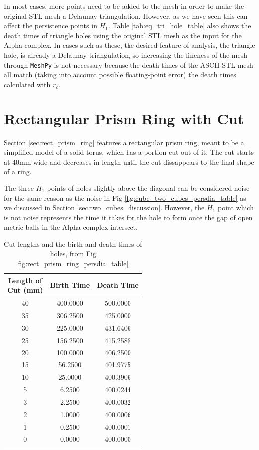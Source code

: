 \documentclass[ma]{uncgdissertationexp}
\theoremstyle{plain}
\theoremstyle{definition}
\theoremstyle{remark}
\begin{document}
\par In most cases, more points need to be added to the mesh in order to make the original STL mesh a Delaunay triangulation. However, as we have seen this can affect the persistence points in $H_{1}$. Table \ref{tab:eq_tri_hole_table} also shows the death times of triangle holes using the original STL mesh as the input for the Alpha complex. In cases such as these, the desired feature of analysis, the triangle hole, is already a Delaunay triangulation, so increasing the fineness of the mesh through \verb"MeshPy" is not necessary because the death times of the ASCII STL mesh all match (taking into account possible floating-point error) the death times calculated with $r_{c}$.

\newpage
\section{Rectangular Prism Ring with Cut}
\par Section \ref{sec:rect_prism_ring} features a rectangular prism ring, meant to be a simplified model of a solid torus, which has a portion cut out of it. The cut starts at 40mm wide and decreases in length until the cut dissappears to the final shape of a ring.
\par The three $H_{1}$ points of holes slightly above the diagonal can be considered noise for the same reason as the noise in Fig \ref{fig:cube_two_cubes_persdia_table} as we discussed in Section \ref{sec:two_cubes_discussion}. However, the $H_{1}$ point which is not noise represents the time it takes for the hole to form once the gap of open metric balls in the Alpha complex intersect.
\begin{table}[H]
\centering
\begin{tabular}{|c|c|c|}
    \hline
    \makecell{Length of\\Cut (mm)} & Birth Time & Death Time \\
    \hline
    40 & 400.0000 & 500.0000 \\
    35 & 306.2500 & 425.0000 \\
    30 & 225.0000 & 431.6406 \\
    25 & 156.2500 & 415.2588 \\
    20 & 100.0000 & 406.2500 \\
    15 & 56.2500 & 401.9775 \\
    10 & 25.0000 & 400.3906 \\
    5 & 6.2500 & 400.0244 \\
    3 & 2.2500 & 400.0032 \\
    2 & 1.0000 & 400.0006 \\
    1 & 0.2500 & 400.0001 \\
    0 & 0.0000 & 400.0000 \\
    \hline
\end{tabular}
\caption{Cut lengths and the birth and death times of holes, from Fig \ref{fig:rect_prism_ring_persdia_table}.}
\end{table}
\end{document}
